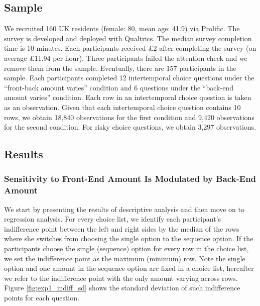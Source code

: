 \documentclass[
  12pt,
]{article}
\begin{document}
\hypertarget{sample-2}{%
\subsection{Sample}\label{sample-2}}

We recruited 160 UK residents (female: 80, mean age: 41.9) via Prolific.
The survey is developed and deployed with Qualtrics. The median survey
completion time is 10 minutes. Each participants received £2 after
completing the survey (on average £11.94 per hour). Three participants
failed the attention check and we remove them from the sample.
Eventually, there are 157 participants in the sample. Each participants
completed 12 intertemporal choice questions under the ``front-back
amount varies'' condition and 6 questions under the ``back-end amount
varies'' condition. Each row in an intertemporal choice question is
taken as an observation. Given that each intertemporal choice question
contains 10 rows, we obtain 18,840 observations for the first condition
and 9,420 observations for the second condition. For risky choice
questions, we obtain 3,297 observations.

\hypertarget{results-2}{%
\subsection{Results}\label{results-2}}

\hypertarget{sensitivity-to-front-end-amount-is-modulated-by-back-end-amount}{%
\subsubsection{Sensitivity to Front-End Amount Is Modulated by Back-End
Amount}\label{sensitivity-to-front-end-amount-is-modulated-by-back-end-amount}}

We start by presenting the results of descriptive analysis and then move
on to regression analysis. For every choice list, we identify each
participant's indifference point between the left and right sides by the
median of the rows where she switches from choosing the single option to
the sequence option. If the participants choose the single (sequence)
option for every row in the choice list, we set the indifference point
as the maximum (minimum) row. Note the single option and one amount in
the sequence option are fixed in a choice list, hereafter we refer to
the indifference point with the only amount varying across rows. Figure
\ref{fig:exp1_indiff_sd} shows the standard deviation of such
indifference points for each question.
\end{document}
